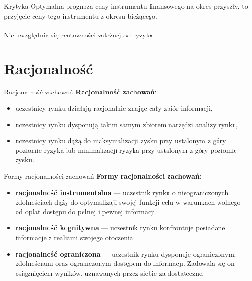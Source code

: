 \documentclass[a4paper, 11pt]{beamer}
\begin{document}
	\begin{frame}{Krytyka}
		Optymalna prognoza ceny instrumentu finansowego na okres przyszły, to przyjęcie ceny tego instrumentu z okresu bieżącego.
		\\~\\
		Nie uwzględnia się rentowności zależnej od ryzyka.
	\end{frame}
	
	\section{Racjonalność}
	
	\begin{frame}{Racjonalność zachowań}
		\textbf{Racjonalność zachowań:}
		\begin{itemize}
			\item uczestnicy rynku działają racjonalnie znając cały zbiór informacji,
			\item uczestnicy rynku dysponują takim samym zbiorem narzędzi analizy rynku,
			\item uczestnicy rynku dążą do maksymalizacji zysku przy ustalonym z góry poziomie ryzyka
				lub minimalizacji ryzyka przy ustalonym z góry poziomie zysku.
		\end{itemize}
	\end{frame}
	
	\begin{frame}{Formy racjonalności zachowań}
		\textbf{Formy racjonalności zachowań:}
		\begin{itemize}
			\item \textbf{racjonalność instrumentalna} --- uczestnik rynku o nieograniczonych zdolnościach
				dąży do optymalizaji swojej funkcji celu w warunkach wolnego od opłat dostępu do pełnej i pewnej
				informacji.
			\item \textbf{racjonalność kognitywna} --- uczestnik rynku konfrontuje posiadane informacje z
				realiami swojego otoczenia.
			\item \textbf{racjonalność ograniczona} --- uczestnik rynku dysponuje ograniczonymi zdolnościami
				oraz ograniczonym dostępem do informacji. Zadowala się on osiągnięciem wyników, uznawanych przez
				siebie za dostateczne.
		\end{itemize}
	\end{frame}
	
\end{document}
